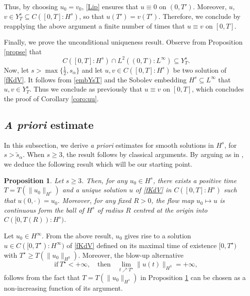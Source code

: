 \documentclass{amsart}
\newtheorem{proposition}[theorem]{Proposition}
\theoremstyle{definition}
\theoremstyle{remark}
\numberwithin{equation}{section}
\begin{document}
Thus, by choosing $u_0=v_0$, \eqref{Lip} ensures that $u\equiv 0$ on $(0,T')$. Moreover, $u$, $v \in Y^s_T \subseteq C([0,T] :H^s)$,  so that $u(T')=v(T')$. Therefore, we conclude by reapplying the above argument a finite number of times that $u\equiv v$ on $[0,T]$. 

Finally, we prove the unconditional uniqueness result. Observe from Proposition \ref{propse} that 
\begin{equation} \label{embYsT}
C([0,T]:H^s) \cap L^2((0,T) : L^\infty) \subseteq Y^s_T .
\end{equation}
Now, let $s>\max\{\frac12,s_\alpha\}$ and let $u , v \in C([0,T] : H^s)$ be two solution of \eqref{fKdV}. It follows from \eqref{embYsT} and the Sobolev embedding $H^s \subseteq L^\infty$ that $u, v \in Y^s_T$. Thus we conclude as previously that $u \equiv v$ on $[0,T]$, which concludes the proof of Corollary \ref{coro:uu}.


\subsection{\emph{A priori} estimate} In this subsection, we derive \emph{a priori} estimates for smooth solutions in $H^s$, for $s>\widetilde{s}_\alpha$. When $s \ge 3$, the result follows by classical arguments. By arguing as in \cite{ABFS89}, we deduce the following result which will be our starting point. 
\begin{proposition} \label{propo:smooth}
Let $s \ge 3$. Then, for any $u_0 \in H^s$, there exists a positive time $T=T(\|u_0\|_{H^s})$ and a unique solution $u$ of \eqref{fKdV} in $C([0,T] : H^s)$ such that $u(0,\cdot)=u_0$. Moreover, for any fixed $R>0$, the flow map $u_0 \mapsto u$ is continuous form the ball of $H^s$ of radius $R$ centred at the origin into $C([0,T(R)) : H^s)$.  
\end{proposition}

Let $u_0 \in H^{\infty}$. From the above result, $u_0$ gives rise to a solution $u \in C([0,T^\star) : H^\infty)$ of \eqref{fKdV} defined on its maximal time of existence $[0,T^{\star})$ with $T^\star \ge T(\|u_0\|_{H^3})$. Moreover,  the blow-up alternative
\begin{equation} \label{BUA}
\text{if} \ T^\star<+\infty, \quad \text{then} \quad \lim_{t \nearrow T^\star} \|u(t) \|_{H^3} =+\infty ,
\end{equation}
follows from the fact that $T=T(\|u_0\|_{H^s})$ in Proposition \ref{propo:smooth} can be chosen as a non-increasing function of its argument. 
\end{document}
